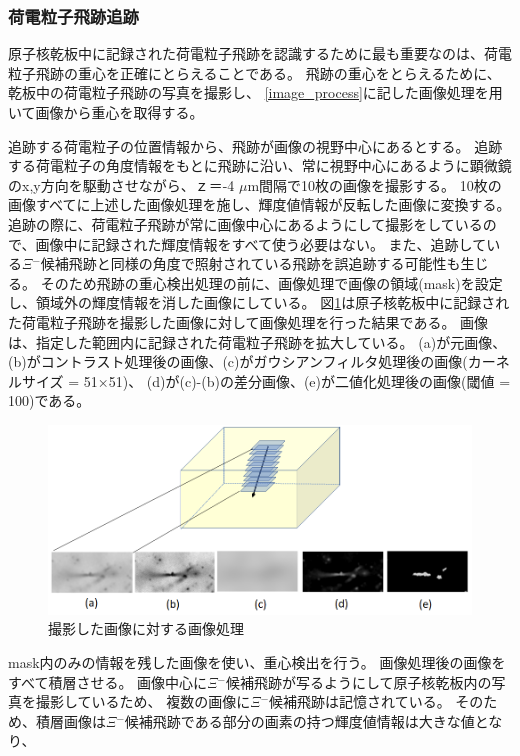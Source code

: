 \documentclass[12pt,a4paper]{jarticle}
\begin{document}
\subsubsection{荷電粒子飛跡追跡}\label{track_following}
原子核乾板中に記録された荷電粒子飛跡を認識するために最も重要なのは、荷電粒子飛跡の重心を正確にとらえることである。
飛跡の重心をとらえるために、乾板中の荷電粒子飛跡の写真を撮影し、
\ref{image_process}に記した画像処理を用いて画像から重心を取得する。
\par
追跡する荷電粒子の位置情報から、飛跡が画像の視野中心にあるとする。
追跡する荷電粒子の角度情報をもとに飛跡に沿い、常に視野中心にあるように顕微鏡のx,y方向を駆動させながら、ｚ＝-4 $\mu$m間隔で10枚の画像を撮影する。
10枚の画像すべてに上述した画像処理を施し、輝度値情報が反転した画像に変換する。
追跡の際に、荷電粒子飛跡が常に画像中心にあるようにして撮影をしているので、画像中に記録された輝度情報をすべて使う必要はない。
また、追跡している$\Xi$$^-$候補飛跡と同様の角度で照射されている飛跡を誤追跡する可能性も生じる。
そのため飛跡の重心検出処理の前に、画像処理で画像の領域(mask)を設定し、領域外の輝度情報を消した画像にしている。
図\ref{fig:tuiseki_gazou}は原子核乾板中に記録された荷電粒子飛跡を撮影した画像に対して画像処理を行った結果である。
画像は、指定した範囲内に記録された荷電粒子飛跡を拡大している。
(a)が元画像、(b)がコントラスト処理後の画像、(c)がガウシアンフィルタ処理後の画像(カーネルサイズ = 51×51)、
(d)が(c)-(b)の差分画像、(e)が二値化処理後の画像(閾値 = 100)である。
\begin{figure}[htbp]
  \centering
     \includegraphics[width=140mm]{tuiseki_gazou.png}
  \caption{撮影した画像に対する画像処理\label{fig:tuiseki_gazou}}
\end{figure}
\par
mask内のみの情報を残した画像を使い、重心検出を行う。
画像処理後の画像をすべて積層させる。
画像中心に$\Xi$$^-$候補飛跡が写るようにして原子核乾板内の写真を撮影しているため、
複数の画像に$\Xi$$^-$候補飛跡は記憶されている。
そのため、積層画像は$\Xi$$^-$候補飛跡である部分の画素の持つ輝度値情報は大きな値となり、
\end{document}
